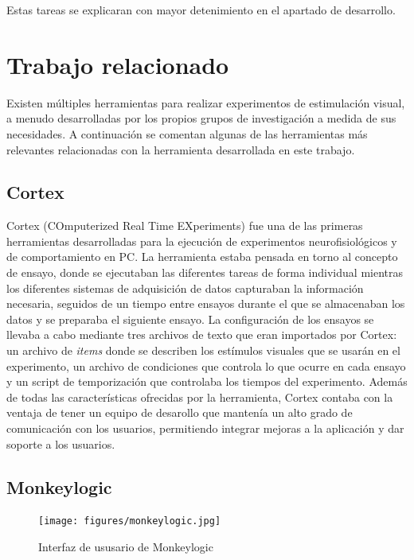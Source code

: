 \documentclass[conference]{IEEEtran}
\begin{document}
Estas tareas se explicaran con mayor detenimiento en el apartado de desarrollo.

\section{Trabajo relacionado}

Existen múltiples herramientas para realizar experimentos de estimulación visual, a menudo desarrolladas por los propios grupos de investigación a medida de sus necesidades. A continuación se comentan algunas de las herramientas más relevantes relacionadas con la herramienta desarrollada en este trabajo.

\subsection{Cortex}

Cortex (COmputerized Real Time EXperiments)\cite{cortex} fue una de las primeras herramientas desarrolladas para la ejecución de experimentos neurofisiológicos y de comportamiento en PC.
La herramienta estaba pensada en torno al concepto de ensayo, donde se ejecutaban las diferentes tareas de forma individual mientras los diferentes sistemas de adquisición de datos capturaban la información necesaria, seguidos de un tiempo entre ensayos durante el que se almacenaban los datos y se preparaba el siguiente ensayo. 
La configuración de los ensayos se llevaba a cabo mediante tres archivos de texto que eran importados por Cortex: un archivo de \textit{items} donde se describen los estímulos visuales que se usarán en el experimento, un archivo de condiciones que controla lo que ocurre en cada ensayo y un script de temporización que controlaba los tiempos del experimento. Además de todas las características ofrecidas por la herramienta, Cortex contaba con la ventaja de tener un equipo de desarollo que mantenía un alto grado de comunicación con los usuarios, permitiendo integrar mejoras a la aplicación y dar soporte a los usuarios.


\subsection{Monkeylogic}

\begin{figure}[htbp]
\centerline{\texttt{[image: figures/monkeylogic.jpg]}}
\caption{Interfaz de ususario de Monkeylogic}
\label{figMonkeyLogic}
\end{figure}
\end{document}
